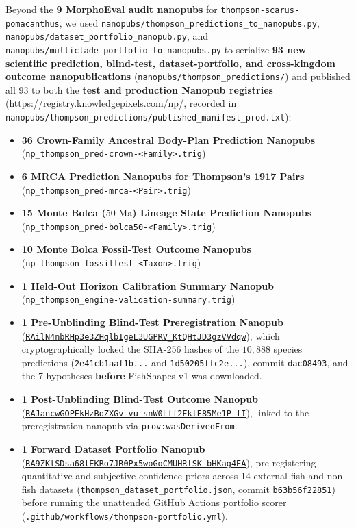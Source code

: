 \documentclass[10.5pt,a4paper]{article}
\newcommand{\code}[1]{{\footnotesize\nolinkurl{#1}}}
\begin{document}
Beyond the \textbf{9 MorphoEval audit nanopubs} for \code{thompson-scarus-pomacanthus}, we used \code{nanopubs/thompson_predictions_to_nanopubs.py}, \code{nanopubs/dataset_portfolio_nanopub.py}, and \code{nanopubs/multiclade_portfolio_to_nanopubs.py} to serialize \textbf{93 new scientific prediction, blind-test, dataset-portfolio, and cross-kingdom outcome nanopublications} (\code{nanopubs/thompson_predictions/}) and published all 93 to both the \textbf{test and production Nanopub registries} (\url{https://registry.knowledgepixels.com/np/}, recorded in \code{nanopubs/thompson_predictions/published_manifest_prod.txt}):
\begin{itemize}
  \setlength{\itemsep}{2pt}
  \item \textbf{36 Crown-Family Ancestral Body-Plan Prediction Nanopubs} (\code{np_thompson_pred-crown-<Family>.trig})
  \item \textbf{6 MRCA Prediction Nanopubs for Thompson's 1917 Pairs} (\code{np_thompson_pred-mrca-<Pair>.trig})
  \item \textbf{15 Monte Bolca ($50\text{ Ma}$) Lineage State Prediction Nanopubs} (\code{np_thompson_pred-bolca50-<Family>.trig})
  \item \textbf{10 Monte Bolca Fossil-Test Outcome Nanopubs} (\code{np_thompson_fossiltest-<Taxon>.trig})
  \item \textbf{1 Held-Out Horizon Calibration Summary Nanopub} (\code{np_thompson_engine-validation-summary.trig})
  \item \textbf{1 Pre-Unblinding Blind-Test Preregistration Nanopub} (\href{https://registry.knowledgepixels.com/np/RAilN4nbRHp3e3ZHqlbIgeL3UGPRV_KtQHtJD3gzVVdqw}{\code{RAilN4nbRHp3e3ZHqlbIgeL3UGPRV_KtQHtJD3gzVVdqw}}), which cryptographically locked the SHA-256 hashes of the $10{,}888$ species predictions (\code{2e41cb1aaf1b...} and \code{1d50205ffc2e...}), commit \texttt{dac08493}, and the 7 hypotheses \textbf{before} FishShapes v1 was downloaded.
  \item \textbf{1 Post-Unblinding Blind-Test Outcome Nanopub} (\href{https://registry.knowledgepixels.com/np/RAJancwGOPEkHzBoZXGv_vu_snW0Lff2FktE85Me1P-fI}{\code{RAJancwGOPEkHzBoZXGv_vu_snW0Lff2FktE85Me1P-fI}}), linked to the preregistration nanopub via \texttt{prov:wasDerivedFrom}.
  \item \textbf{1 Forward Dataset Portfolio Nanopub} (\href{https://registry.knowledgepixels.com/np/RA9ZKlSDsa68lEKRo7JR0Px5woGoCMUHRlSK_bHKag4EA}{\code{RA9ZKlSDsa68lEKRo7JR0Px5woGoCMUHRlSK_bHKag4EA}}), pre-registering quantitative and subjective confidence priors across 14 external fish and non-fish datasets (\code{thompson_dataset_portfolio.json}, commit \texttt{b63b56f22851}) before running the unattended GitHub Actions portfolio scorer (\code{.github/workflows/thompson-portfolio.yml}).

\end{itemize}
\end{document}
